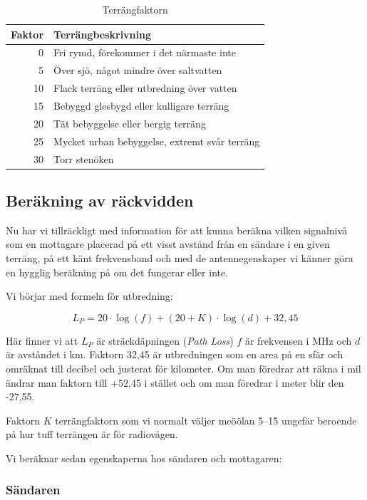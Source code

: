 \begin{table}[h]
\centering
\begin{tabular}{rl}
	Faktor & Terrängbeskrivning                            \\ \hline
	     0 & Fri rymd, förekommer i det närmaste inte      \\
	     5 & Över sjö, något mindre över saltvatten        \\
	    10 & Flack terräng eller utbredning över vatten    \\
	    15 & Bebyggd glesbygd eller kulligare terräng      \\
	    20 & Tät bebyggelse eller bergig terräng           \\
	    25 & Mycket urban bebyggelse, extremt svår terräng \\
	    30 & Torr stenöken
\end{tabular}
\caption{Terrängfaktorn}
\end{table}

\subsection{Beräkning av räckvidden}

Nu har vi tillräckligt med information för att kunna beräkna vilken signalnivå som en mottagare placerad på ett visst avstånd från en sändare i en given terräng, på ett känt frekvensband och med de antennegenskaper vi känner göra en hygglig beräkning på om det fungerar eller inte.

Vi börjar med formeln för utbredning:

\begin{equation}
L_P = 20\cdot\log(f)+(20+K)\cdot\log(d)+32,45
\end{equation}

Här finner vi att $L_P$ är sträckdäpningen (\textit{Path Loss}) $f$ är frekvensen i MHz och $d$ är avståndet i km. Faktorn 32,45 är utbredningen som en area på en sfär och omräknat till decibel och justerat för kilometer. Om man föredrar att räkna i mil ändrar man faktorn till +52,45 i stället och om man föredrar i meter blir den -27,55.

Faktorn $K$ terrängfaktorn som vi normalt väljer meöölan 5--15 ungefär beroende på hur tuff terrängen är för radiovågen.

Vi beräknar sedan egenskaperna hos sändaren och mottagaren:

\subsubsection{Sändaren}

